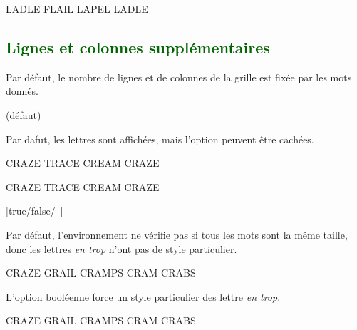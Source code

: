 \documentclass[svgnames]{report}
\newcommand\Section[1]{\subsection{\textcolor{DarkGreen}{#1}}}
\begin{document}
  \begin{example}
  \begin{wordle}[Epaisseur=0.75mm,CouleurBordures=red]{LADLE}
     FLAIL
     LAPEL
     LADLE
  \end{wordle}
  \end{example}

  \Section{Lignes et colonnes supplémentaires}

  Par défaut, le nombre de lignes et de colonnes de la grille est fixée par les mots donnés.

   (défaut)\qquad

  Par dafut, les lettres sont affichées, mais l'option  peuvent être cachées.

  \begin{example}
  \begin{wordle}{CRAZE} %
    TRACE
    CREAM
    CRAZE
  \end{wordle}
  \end{example}

  \begin{example}
  \begin{wordle}[NonLettres]{CRAZE}
    TRACE
    CREAM
    CRAZE
  \end{wordle}
  \end{example}

  [true/false/--]

  Par défaut, l'environnement ne vérifie pas si tous les mots sont la même taille, donc les lettres \textit{en trop} n'ont pas de style particulier.

  \begin{example}
  \begin{wordle}[Strict=false]{CRAZE} %
    GRAIL
    CRAMPS
    CRAM
    CRABS
  \end{wordle}
  \end{example}

  L'option booléenne  force un style particulier des lettre \textit{en trop}.

  \begin{example}
  \begin{wordle}[Strict]{CRAZE}
    GRAIL
    CRAMPS
    CRAM
    CRABS
  \end{wordle}
  \end{example}

\end{document}
